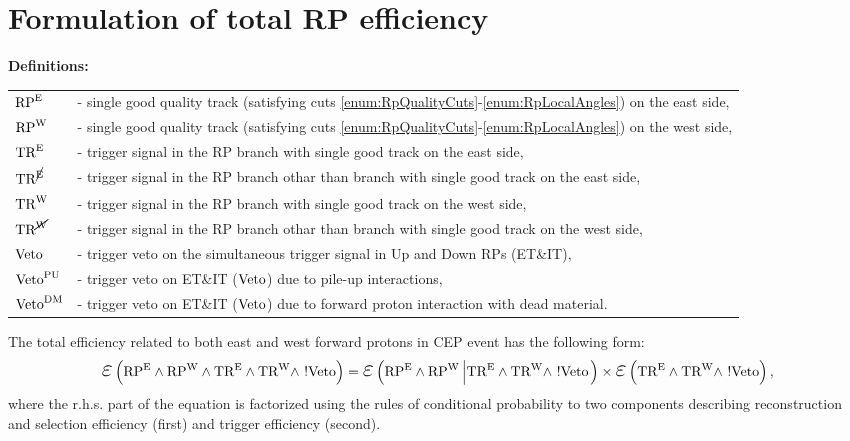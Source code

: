 
\chapter{Formulation of total RP efficiency}\label{appendix:totalRpEffFormulation}


\textbf{Definitions:}\\[7pt]
\begin{tabular}{ll}
$\text{RP}^{\text{E}}$ &- single good quality track (satisfying cuts \ref{enum:RpQualityCuts}-\ref{enum:RpLocalAngles}) on the east side,\\
$\text{RP}^{\text{W}}$ & - single good quality track (satisfying cuts \ref{enum:RpQualityCuts}-\ref{enum:RpLocalAngles}) on the west side,\\
$\text{TR}^{\text{E}}$ & - trigger signal in the RP branch with single good track on the east side,\\
$\text{TR}^{\cancel{\text{E}}}$ & - trigger signal in the RP branch othar than branch with single good track on the east side,\\
$\text{TR}^{\text{W}}$ & - trigger signal in the RP branch with single good track on the west side,\\
$\text{TR}^{\cancel{\text{W}}}$ & - trigger signal in the RP branch othar than branch with single good track on the west side,\\
$\text{Veto}$ & - trigger veto on the simultaneous trigger signal in Up and Down RPs (ET\&IT),\\
$\text{Veto}^{\text{PU}}$ & - trigger veto on ET\&IT ($\text{Veto}$) due to pile-up interactions,\\
$\text{Veto}^{\text{DM}}$ & - trigger veto on ET\&IT ($\text{Veto}$) due to forward proton interaction with dead material.\\ 
\end{tabular}\vspace{10pt}


The total efficiency related to both east and west forward protons in CEP event has the following form:
\begin{equation}
\mbox{\LARGE$\varepsilon$}\left(\RPE\land\RPW\land\TRE\land\TRW\land~!\V\right) = \mbox{\LARGE$\varepsilon$}\left(\RPE\land\RPW\left|\TRE\land\TRW\land~!\V\right.\right)\times\mbox{\LARGE$\varepsilon$}\left(\TRE\land\TRW\land~!\V\right),
\end{equation}
where the r.h.s. part of the equation is factorized using the rules of conditional probability to two components describing reconstruction and selection efficiency (first) and trigger efficiency (second).


